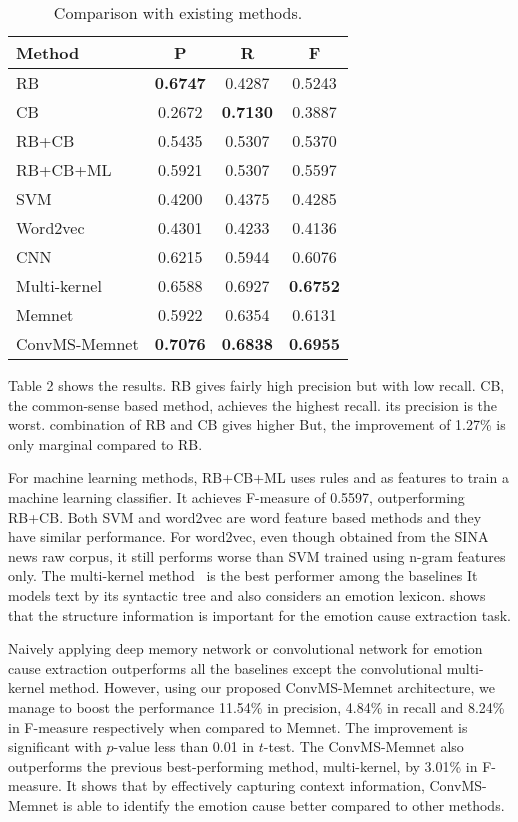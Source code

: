 \documentclass[11pt,letterpaper]{article}
\begin{document}
\begin{CJK*}{UTF8}{gbsn}
\begin{table}
\centering
\small
\begin{tabular}{|l|c|c|c|}
\hline
{\bf Method} & {\bf P} & {\bf R} & {\bf F}\\\hline
RB & \bf0.6747&	0.4287&	0.5243\\
CB  & 0.2672	&\bf0.7130	&0.3887\\
RB+CB & 0.5435&	0.5307&	0.5370\\ 
RB+CB+ML & 0.5921	&0.5307&	0.5597\\ 
SVM &0.4200	&0.4375&	0.4285\\
Word2vec & 0.4301&	0.4233&	0.4136\\ 
{CNN}  & 0.6215&	0.5944&	0.6076\\
Multi-kernel  & 0.6588	&0.6927	&\bf0.6752\\ \hline
{Memnet}  & 0.5922&	0.6354&	0.6131\\
{ConvMS-Memnet} & \bf 0.7076 &	\bf0.6838	&\bf0.6955\\ \hline
\end{tabular} 
\caption{Comparison with existing methods.}
\end{table}



Table 2 shows the results.
 RB gives fairly high precision but with low recall. CB, the common-sense based method, achieves the highest recall.
 its precision is the worst.  combination of RB and CB gives higher 
But, the improvement of 1.27\% is only marginal compared to RB. 



For machine learning methods, RB+CB+ML uses  rules and  as features to train a machine learning classifier. It achieves F-measure of 0.5597, outperforming RB+CB. Both SVM and word2vec are word feature based methods and they have similar performance. For word2vec, even though   obtained from the SINA news raw corpus, it still performs worse than SVM trained using n-gram features only. The multi-kernel  method~\cite{gui2016event} is the best performer among the baselines  It models text by its syntactic tree and also considers an emotion lexicon.  shows that the structure information is important for the emotion cause extraction task.

Naively applying  deep memory network or convolutional network for emotion cause extraction outperforms all the baselines except the convolutional multi-kernel method. However, using our proposed ConvMS-Memnet architecture, we manage to boost the performance  11.54\% in precision, 4.84\% in recall and 8.24\% in F-measure respectively when compared to Memnet. 
The improvement is  significant with $p$-value less than 0.01 in $t$-test. The ConvMS-Memnet also outperforms the previous best-performing method, multi-kernel, by 3.01\% in F-measure. It shows that by effectively capturing context information, ConvMS-Memnet is able to identify the emotion cause better compared to other methods. 


\end{CJK*}
\end{document}
